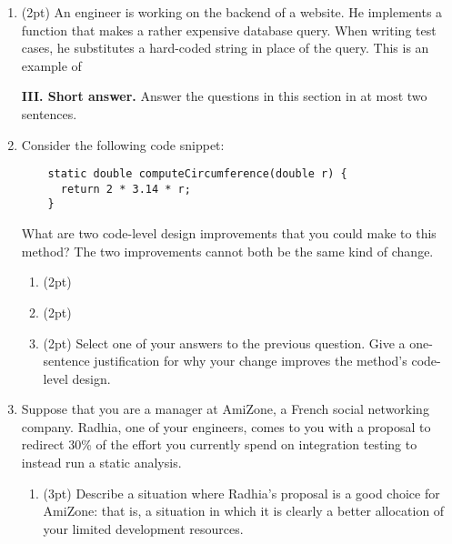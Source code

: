 \documentclass{report}
\newif\ifkey
\newcommand{\answershort}[1]{\ifkey\color{red}\underline{\textbf{#1}}\color{black}\else\underline{\hspace{3in}}\fi\xspace}
\newcommand{\answerlong}[1]{\ifkey\color{red}\textbf{#1}\color{black}\else\vspace{0.5in}\fi\xspace}
\newcommand*{\pts}[1]{\addtocounter{points}{#1}(#1pt)}
\begin{document}
\begin{spacing}{1.4}
\begin{enumerate}[leftmargin=*]
  \item \pts{2} An engineer is working on the backend of a website. He implements a function that makes a rather expensive
    database query. When writing test cases, he substitutes a hard-coded string in place of the query. This is an example of
     \answershort{mocking}
  
  \newpage

  \textbf{III. Short answer.} Answer the questions in this section in at most two sentences.

\item Consider the following code snippet: \\
  \begin{lstlisting}
    static double computeCircumference(double r) {
      return 2 * 3.14 * r;
    }
  \end{lstlisting}

  What are two code-level design improvements that you could make to this method? The two improvements cannot both be the same kind of change.
  \begin{enumerate}
  \item \pts{2} \answershort{replace 3.14 with a PI constant} 
  \item \pts{2} \answershort{rename ``r'' to ``radius'' or rename ``computeCircumference'' to ``circumference''}

  \item \pts{2} Select one of your answers to the previous question. Give a one-sentence justification for why your change
  improves the method's code-level design.

  \answerlong{For 1. above: ``avoid magic numbers'' or ``more self-documenting''. For 2. above: ``radius'' is more descriptive than ``r'', or ``compute'' is a verb, but the method returns a noun-like type.}

  \end{enumerate}

  \item Suppose that you are a manager at AmiZone, a French social networking company. Radhia, one of your engineers, comes to you
    with a proposal to redirect 30\% of the effort you currently spend on integration testing to instead run a static analysis.
\begin{enumerate}
  \item \pts{3} Describe a situation where Radhia's proposal is a good choice for AmiZone: that is, a situation in which it
    is clearly a better allocation of your limited development resources.
    \\
    \answerlong{Answers can vary. ``AmiZone is concerned about security bugs.'' is the shortest, best answer; short answers that
      identify a class of bugs that static analysis is good at will get full credit..}


\end{enumerate}
\end{enumerate}
\end{spacing}
\end{document}
